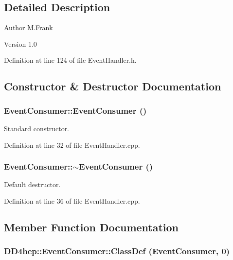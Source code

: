 \subsection{Detailed Description}
\begin{DoxyAuthor}{Author}
M.Frank 
\end{DoxyAuthor}
\begin{DoxyVersion}{Version}
1.0 
\end{DoxyVersion}


Definition at line 124 of file EventHandler.h.

\subsection{Constructor \& Destructor Documentation}
\hypertarget{class_d_d4hep_1_1_event_consumer_a6d0402e70c6479da0fc45e0dee5d050d}{
\subsubsection[{EventConsumer}]{\setlength{\rightskip}{0pt plus 5cm}EventConsumer::EventConsumer ()}}
\label{class_d_d4hep_1_1_event_consumer_a6d0402e70c6479da0fc45e0dee5d050d}


Standard constructor. 

Definition at line 32 of file EventHandler.cpp.\hypertarget{class_d_d4hep_1_1_event_consumer_aa78ac766120d4cbe9e92dc18af5111c8}{
\subsubsection[{$\sim$EventConsumer}]{\setlength{\rightskip}{0pt plus 5cm}EventConsumer::$\sim$EventConsumer ()}}
\label{class_d_d4hep_1_1_event_consumer_aa78ac766120d4cbe9e92dc18af5111c8}


Default destructor. 

Definition at line 36 of file EventHandler.cpp.

\subsection{Member Function Documentation}
\hypertarget{class_d_d4hep_1_1_event_consumer_a659e7fffc8eb8674af560b124f2a648d}{
\subsubsection[{ClassDef}]{\setlength{\rightskip}{0pt plus 5cm}DD4hep::EventConsumer::ClassDef ({\bf EventConsumer}, \/  0)}}
\label{class_d_d4hep_1_1_event_consumer_a659e7fffc8eb8674af560b124f2a648d}


